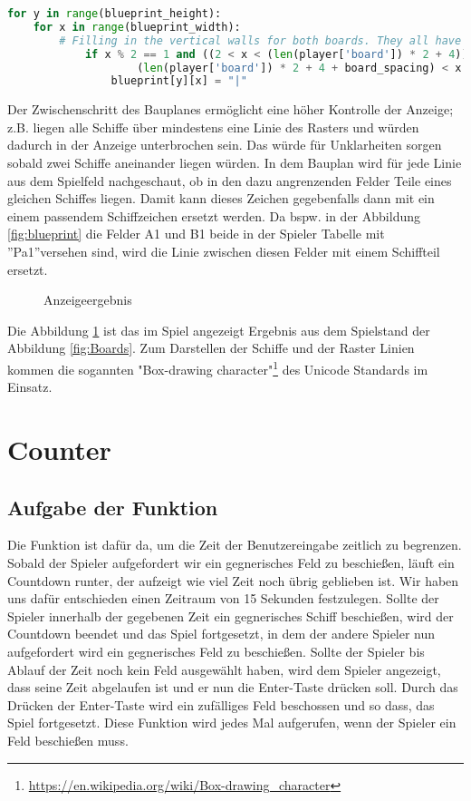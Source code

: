 \documentclass{article}
\begin{document}
\begin{lstlisting}[language=Python, caption =Beispiel zum Einfügen von bestimmten Teilen des Spielfeldrasters, label=lst:Grid example]
for y in range(blueprint_height):
    for x in range(blueprint_width):
        # Filling in the vertical walls for both boards. They all have odd x coordinate
            if x % 2 == 1 and ((2 < x < (len(player['board']) * 2 + 4)) or (
                    (len(player['board']) * 2 + 4 + board_spacing) < x < blueprint_width)):
                blueprint[y][x] = "|"
\end{lstlisting}
\par
    Der Zwischenschritt des Bauplanes ermöglicht eine höher Kontrolle der Anzeige; z.B. liegen alle Schiffe über mindestens eine Linie des Rasters und würden dadurch in der Anzeige unterbrochen sein. Das würde für Unklarheiten sorgen sobald zwei Schiffe aneinander liegen würden. In dem Bauplan wird für jede Linie aus dem Spielfeld nachgeschaut, ob in den dazu angrenzenden Felder Teile eines gleichen Schiffes liegen. Damit kann dieses Zeichen gegebenfalls dann mit ein einem passendem Schiffzeichen ersetzt werden. Da bspw. in der Abbildung \ref{fig:blueprint} die Felder A1 und B1 beide in der Spieler Tabelle mit ''Pa1''versehen sind, wird die Linie zwischen diesen Felder mit einem Schiffteil ersetzt.

\begin{figure}[H]
    \centering
    
    \caption{Anzeigeergebnis}
    \label{fig:Result}
\end{figure}
    Die Abbildung \ref{fig:Result} ist das im Spiel angezeigt Ergebnis aus dem Spielstand der Abbildung \ref{fig:Boards}. Zum Darstellen der Schiffe und der Raster Linien kommen die sogannten "Box-drawing character"\footnote{\url{https://en.wikipedia.org/wiki/Box-drawing_character}} des Unicode Standards im Einsatz.

\section{Counter}
\subsection{Aufgabe der Funktion}
\par
    Die Funktion ist dafür da, um die Zeit der Benutzereingabe zeitlich zu begrenzen. Sobald der Spieler aufgefordert wir ein gegnerisches Feld zu beschießen,  läuft ein Countdown runter, der aufzeigt wie viel Zeit noch übrig geblieben ist. Wir haben uns dafür entschieden einen Zeitraum von 15 Sekunden festzulegen. Sollte der Spieler innerhalb der gegebenen Zeit ein gegnerisches Schiff beschießen, wird der Countdown beendet und das Spiel fortgesetzt, in dem der andere Spieler nun aufgefordert wird ein gegnerisches Feld zu beschießen. Sollte der Spieler bis Ablauf der Zeit noch kein Feld ausgewählt haben, wird dem Spieler angezeigt, dass seine Zeit abgelaufen ist und er nun die Enter-Taste drücken soll. Durch das Drücken der Enter-Taste wird ein zufälliges Feld beschossen und so dass, das Spiel fortgesetzt.
Diese Funktion wird jedes Mal aufgerufen, wenn der Spieler ein Feld beschießen muss.
\end{document}

